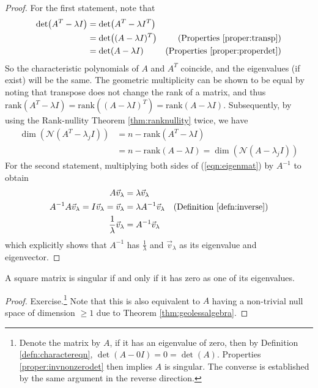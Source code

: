 \begin{proof}
For the first statement, note that
\begin{align*}
\det(A^T -\lambda I) &= \det(A^T - \lambda I^T) \\
&= \det((A - \lambda I)^T) & \text{(Properties \ref{proper:transp})} \\
&= \det(A - \lambda I) & \text{(Properties \ref{proper:properdet})}
\end{align*}
So the characteristic polynomials of $A$ and $A^T$ coincide, and the eigenvalues (if exist) will be the same. The geometric multiplicity can be shown to be equal by noting that transpose does not change the rank of a matrix, and thus $\text{rank}(A^T - \lambda I) = \text{rank}((A - \lambda I)^T) = \text{rank}(A - \lambda I)$. Subsequently, by using the Rank-nullity Theorem \ref{thm:ranknullity} twice, we have
\begin{align*}
\dim(\mathcal{N}(A^T-\lambda_j I)) &= n - \text{rank}(A^T - \lambda I) \\
&= n - \text{rank}(A - \lambda I) = \dim(\mathcal{N}(A-\lambda_j I))
\end{align*}
For the second statement, multiplying both sides of (\ref{eqn:eigenmat}) by $A^{-1}$ to obtain
\begin{align*}
A\vec{v}_\lambda &= \lambda\vec{v}_\lambda \\
A^{-1}A\vec{v}_\lambda = I\vec{v}_\lambda = \vec{v}_\lambda &= \lambda A^{-1}\vec{v}_\lambda & \text{(Definition \ref{defn:inverse})}\\
\frac{1}{\lambda}\vec{v}_\lambda &= A^{-1}\vec{v}_\lambda 
\end{align*}
which explicitly shows that $A^{-1}$ has $\frac{1}{\lambda}$ and $\vec{v}_\lambda$ as its eigenvalue and eigenvector.
\end{proof}
\begin{thm}
\label{thm:singularzeroeig}
A square matrix is singular if and only if it has zero as one of its eigenvalues.
\end{thm}
\begin{proof}
Exercise.\footnote{Denote the matrix by $A$, if it has an eigenvalue of zero, then by Definition \ref{defn:charactereqn}, $\det(A-0I) = 0 = \det(A)$. Properties \ref{proper:invnonzerodet} then implies $A$ is singular. The converse is established by the same argument in the reverse direction.} Note that this is also equivalent to $A$ having a non-trivial null space of dimension $\geq 1$ due to Theorem \ref{thm:geolessalgebra}.
\end{proof}

